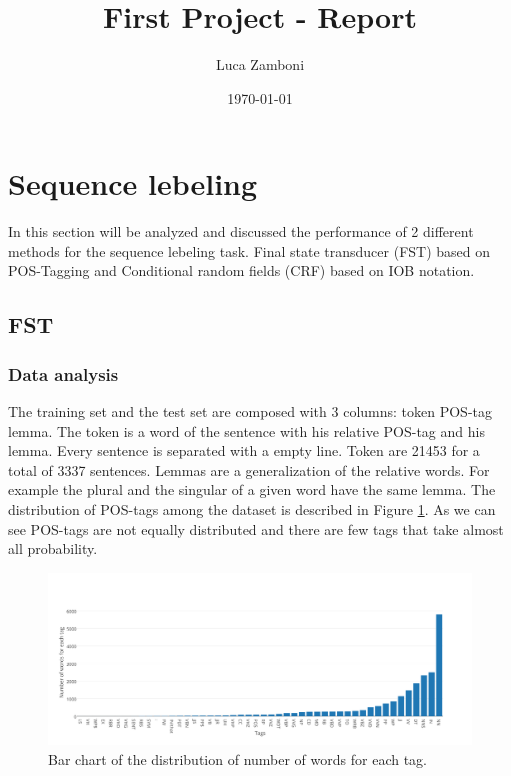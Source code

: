 \documentclass[a4paper,8pt,oneside]{article}
\author{Luca Zamboni}
\title{\vspace{-4em} \LARGE First Project - Report}
\date{\today}
\begin{document}




\tableofcontents
\newpage
\section{Sequence lebeling}

	In this section will be analyzed and discussed the performance of 2 different methods for the sequence lebeling task. Final state transducer (FST) based on POS-Tagging and Conditional random fields (CRF) based on IOB notation.

	\subsection{FST}
		\subsubsection{Data analysis}
			The training set and the test set are composed with 3 columns: token POS-tag lemma.
			The token is a word of the sentence with his relative POS-tag and his lemma. Every sentence is separated with a empty line. Token are 21453 for a total of 3337 sentences. Lemmas are a generalization of the relative words. For example the plural and the singular of a given word have the same lemma. The distribution of POS-tags among the dataset is described in Figure \ref{tag-dist}. As we can see POS-tags are not equally distributed and there are few tags that take almost all probability.
			\begin{figure}[h!]
			  \centering
			    \includegraphics[width=1.0\textwidth]{img/barcharttag}
			  \caption{Bar chart of the distribution of number of words for each tag.}
			  \label{tag-dist}
			\end{figure}
\end{document}
